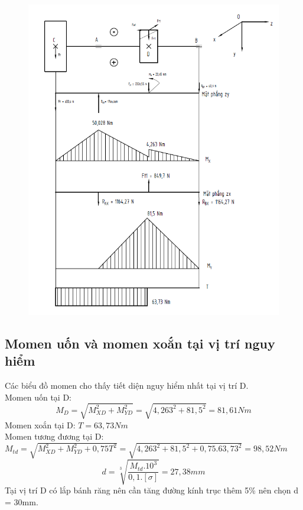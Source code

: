 \begin{figure}[H]
    \centering
    \includegraphics[width=1.1\textwidth]{pictures/luctruc1.png}
\end{figure}
\subsection{Momen uốn và momen xoắn tại vị trí nguy hiểm}
Các biểu đồ momen cho thấy tiết diện nguy hiểm nhất tại vị trí D. \\
Momen uốn tại D: 
\[
    M_D = \sqrt{M_{XD}^2 + M_{YD}^2} = \sqrt{4,263^2 + 81,5^2} = 81,61Nm
\]
Momen xoắn tại D: $T = 63,73Nm$ \\
Momen tương đương tại D: \\
$M_{td} = \sqrt{M_{XD}^2 + M_{YD}^2 + 0,75T^2} = \sqrt{4,263^2 + 81,5^2 + 0,75.63,73^2} = 98,52 Nm$\\
\[
d = \sqrt[3]{\frac{M_{td}.10^3}{0,1.[\sigma]}} = 27,38 mm
\]
Tại vị trí D có lắp bánh răng nên cần tăng đường kính trục thêm 5\% nên chọn d = 30mm. 
